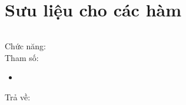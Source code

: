 \section{Sưu liệu cho các hàm}










\begin{lstlisting}

\end{lstlisting}
Chức năng: \\
Tham số: 
\begin{itemize}
\item \lstinline{}
\end{itemize}
Trả về: 